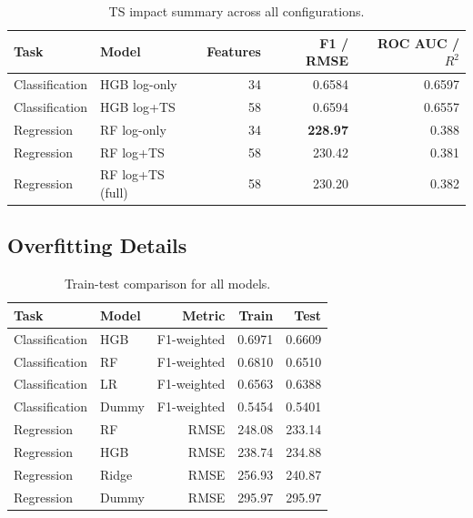 \documentclass[runningheads]{llncs}
\begin{document}
\begin{table}[H]
    \centering
    \caption{TS impact summary across all configurations.}
    \label{tab:app-ts-impact}
    \begin{tabularx}{\textwidth}{llrrr}
        \toprule
        Task & Model & Features & F1 / RMSE & ROC AUC / $R^2$ \\
        \midrule
        Classification & HGB log-only & 34 & 0.6584 & 0.6597 \\
        Classification & HGB log+TS & 58 & 0.6594 & 0.6557 \\
        \midrule
        Regression & RF log-only & 34 & \textbf{228.97} & 0.388 \\
        Regression & RF log+TS & 58 & 230.42 & 0.381 \\
        Regression & RF log+TS (full) & 58 & 230.20 & 0.382 \\
        \bottomrule
    \end{tabularx}
\end{table}

\subsection{Overfitting Details}

\begin{table}[H]
    \centering
    \caption{Train-test comparison for all models.}
    \label{tab:app-overfitting}
    \begin{tabularx}{\textwidth}{llrrr}
        \toprule
        Task & Model & Metric & Train & Test \\
        \midrule
        Classification & HGB & F1-weighted & 0.6971 & 0.6609 \\
        Classification & RF & F1-weighted & 0.6810 & 0.6510 \\
        Classification & LR & F1-weighted & 0.6563 & 0.6388 \\
        Classification & Dummy & F1-weighted & 0.5454 & 0.5401 \\
        \midrule
        Regression & RF & RMSE & 248.08 & 233.14 \\
        Regression & HGB & RMSE & 238.74 & 234.88 \\
        Regression & Ridge & RMSE & 256.93 & 240.87 \\
        Regression & Dummy & RMSE & 295.97 & 295.97 \\
        \bottomrule
    \end{tabularx}
\end{table}
\end{document}
